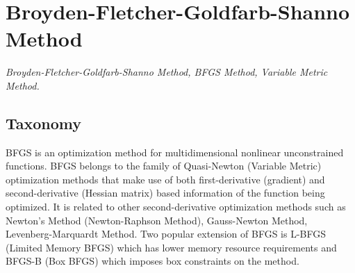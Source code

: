 
\section{Broyden-Fletcher-Goldfarb-Shanno Method} 
\label{sec:bfgs}

\emph{Broyden-Fletcher-Goldfarb-Shanno Method, BFGS Method, Variable Metric Method.}

\subsection{Taxonomy}
BFGS is an optimization method for multidimensional nonlinear unconstrained functions.
BFGS belongs to the family of Quasi-Newton (Variable Metric) optimization methods that make use of both first-derivative (gradient) and second-derivative (Hessian matrix) based information of the function being optimized. It is related to other second-derivative optimization methods such as Newton's Method (Newton-Raphson Method), Gauss-Newton Method, Levenberg-Marquardt Method. 
Two popular extension of BFGS is L-BFGS (Limited Memory BFGS) which has lower memory resource requirements and BFGS-B (Box BFGS) which imposes box constraints on the method.

